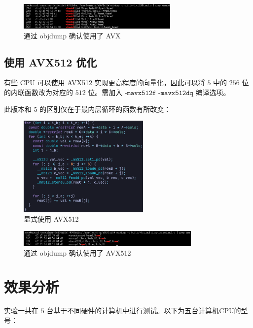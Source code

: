 \documentclass{article}
\begin{document}
\begin{figure}[htbp]
  \centering
  \includegraphics[width=0.7\textwidth]{pics/simd_check.png}
  \caption*{通过 objdump 确认使用了 AVX}
\end{figure}

\vspace{0.7cm}
\subsection{使用 AVX512 优化}

有些 CPU 可以使用 AVX512 实现更高程度的向量化，因此可以将 $5$ 中的 $256$ 位的内联函数改为对应的 $512$ 位。需加入 $\texttt{-mavx512f -mavx512dq}$ 编译选项。

此版本和 $5$ 的区别仅在于最内层循环的函数有所改变：


\begin{figure}[htbp]
  \centering
  \includegraphics[width=0.57\textwidth]{pics/v6code.png}
  \caption*{显式使用 AVX512}
\end{figure}

\begin{figure}[htbp]
  \centering
  \includegraphics[width=0.8\textwidth]{pics/avx512_check.png}
  \caption*{通过 objdump 确认使用了 AVX512}
\end{figure}

\section{效果分析}
\label{section:3}

实验一共在 $5$ 台基于不同硬件的计算机中进行测试。以下为五台计算机CPU的型号：
\end{document}
